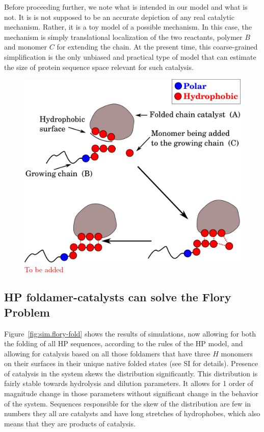 \documentclass[journal=jacsat,manuscript=article,layout=twocolumn]{achemso}
\newcommand*{\red}[1]{\textcolor{red}{#1}}
\begin{document}
Before proceeding further, we note what is intended in our model and what is not.  It is is not 
supposed to be an accurate depiction of any real catalytic mechanism.  Rather, it is a toy 
model of a possible mechanism.  In this case, the mechanism is simply translational 
localization of the two reactants, polymer $B$ and monomer $C$ for extending the chain.  At the 
present time, this coarse-grained simplification is the only unbiased and practical type of model 
that can estimate the size of protein sequence space relevant for such catalysis.
\begin{figure}[h!]
  \centering
  \includegraphics[width=0.9\columnwidth]{pictures/hp-catalysis.pdf} 
  \caption{\red{To be added}}
  \label{fig:hp-catalysis}
\end{figure}


\subsection{HP foldamer-catalysts can solve the Flory Problem}

Figure~\ref{fig:sim.flory-fold} shows the results of simulations, now allowing for both the 
folding of all HP sequences, according to the rules of the HP model, and allowing for catalysis 
based on all those foldamers that have three $H$ monomers on their surfaces in their unique native 
folded states (see SI for details). Presence of catalysis in the system skews the distribution 
significantly. This distribution is fairly stable towards hydrolysis and dilution
parameters. It allows for 1 order of magnitude change in those parameters without significant change 
in the behavior of the system. Sequences responsible for the skew of the distribution are few 
in numbers they all are catalysts and have long stretches of hydrophobes, which also means that they 
are products of catalysis. 
\end{document}
